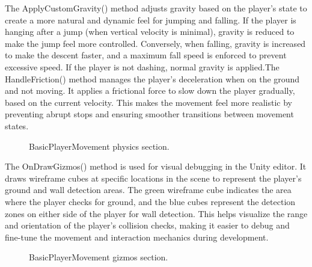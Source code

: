 \documentclass[12pt,oneside,openright,a4paper]{cpe-english-project}
\begin{document}
\newpage
The ApplyCustomGravity() method adjusts gravity based on the player's state to create a more natural and dynamic feel for jumping and falling. If the player is hanging after a jump (when vertical velocity is minimal), gravity is reduced to make the jump feel more controlled. Conversely, when falling, gravity is increased to make the descent faster, and a maximum fall speed is enforced to prevent excessive speed. If the player is not dashing, normal gravity is applied.The HandleFriction() method manages the player's deceleration when on the ground and not moving. It applies a frictional force to slow down the player gradually, based on the current velocity. This makes the movement feel more realistic by preventing abrupt stops and ensuring smoother transitions between movement states.\par
 \begin{figure}[!h]
 \centering
\caption{BasicPlayerMovement physics section.}\label{fig:physics}
\end{figure}
The OnDrawGizmos() method is used for visual debugging in the Unity editor. It draws wireframe cubes at specific locations in the scene to represent the player's ground and wall detection areas. The green wireframe cube indicates the area where the player checks for ground, and the blue cubes represent the detection zones on either side of the player for wall detection. This helps visualize the range and orientation of the player's collision checks, making it easier to debug and fine-tune the movement and interaction mechanics during development.\par
 \begin{figure}[!h]
 \centering
\caption{BasicPlayerMovement gizmos section.}\label{fig:gizmos}
\end{figure}
\newpage
\end{document}
